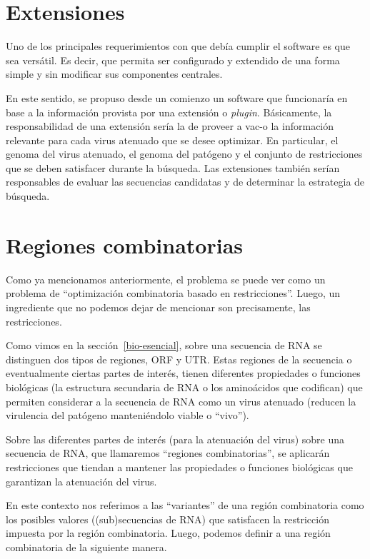 \section{Extensiones}

Uno de los principales requerimientos con que deb\'ia cumplir el software es
que sea vers\'atil. Es decir, que permita ser configurado y extendido de una
forma simple y sin modificar sus componentes centrales.

En este sentido, se propuso desde un comienzo un software que funcionar\'ia en
base a la informaci\'on provista por una extensi\'on o \textit{plugin}.
B\'asicamente, la responsabilidad de una extensi\'on ser\'ia la de proveer a
\ac{vac-o} la informaci\'on relevante para cada virus atenuado que se desee
optimizar. En particular, el genoma del virus atenuado, el genoma del
pat\'ogeno y el conjunto de restricciones que se deben satisfacer durante la
b\'usqueda. Las extensiones tambi\'en ser\'ian responsables de evaluar las
secuencias candidatas y de determinar la estrategia de b\'usqueda.


\section{Regiones combinatorias}

Como ya mencionamos anteriormente, el problema se puede ver como un problema de
``optimizaci\'on combinatoria basado en restricciones''. Luego, un ingrediente
que no podemos dejar de mencionar son precisamente, las restricciones. 

Como vimos en la secci\'on~\ref{bio-esencial}, sobre una secuencia de \ac{RNA}
se distinguen dos tipos de regiones, \ac{ORF} y \ac{UTR}. Estas regiones de la
secuencia o eventualmente ciertas partes de inter\'es, tienen diferentes
propiedades o funciones biol\'ogicas (la estructura secundaria de \ac{RNA} o
los amino\'acidos que codifican) que permiten considerar a la secuencia de
\ac{RNA} como un virus atenuado (reducen la virulencia del pat\'ogeno
manteni\'endolo viable o ``vivo'').

Sobre las diferentes partes de inter\'es (para la atenuaci\'on del virus)
sobre una secuencia de \ac{RNA}, que llamaremos ``regiones combinatorias'', se
aplicar\'an restricciones que tiendan a mantener las propiedades o funciones
biol\'ogicas que garantizan la atenuaci\'on del virus. 

En este contexto nos referimos a las ``variantes'' de una regi\'on combinatoria
como los posibles valores ((sub)secuencias de \ac{RNA}) que satisfacen la
restricci\'on impuesta por la regi\'on combinatoria. Luego, podemos definir a
una regi\'on combinatoria de la siguiente manera.

